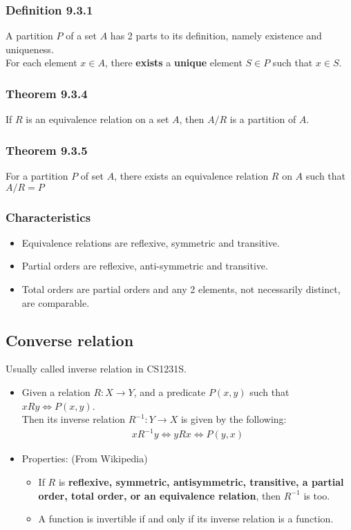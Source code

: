 \documentclass{article}
\begin{document}
\subsubsection{Definition 9.3.1}
A partition $P$ of a set $A$ has 2 parts to its definition, namely existence and uniqueness.\\ 
For each element $x\in A$, there \textbf{exists} a \textbf{unique} element $S\in P$ such that $x\in S$.

\subsubsection{Theorem 9.3.4}
If $R$ is an equivalence relation on a set $A$, then $A/R$ is a partition of $A$.

\subsubsection{Theorem 9.3.5}
For a partition $P$ of set $A$, there exists an equivalence relation $R$ on $A$ such that $A/R=P$

\subsubsection{Characteristics}
\begin{itemize}
	\item Equivalence relations are reflexive, symmetric and transitive.
	\item Partial orders are reflexive, anti-symmetric and transitive.
	\item Total orders are partial orders and any 2 elements, not necessarily distinct, are comparable.
\end{itemize}

\subsection{Converse relation}
Usually called inverse relation in CS1231S.
\begin{itemize}
	\item Given a relation $R:X\rightarrow Y$, and a predicate $P(x,y)$ such that $xRy\iff P(x,y)$.\\
	Then its inverse relation $R^{-1}:Y\rightarrow X$ is given by the following: 
	\begin{align*}
		xR^{-1}y \iff yRx \iff P(y, x)
	\end{align*}
	\item Properties: (From Wikipedia)
	\begin{itemize}
		\item If $R$ is  \textbf{reflexive, symmetric, antisymmetric, transitive, a partial order, total order, or an equivalence relation}, then $R^{-1}$ is too.
		\item A function is invertible if and only if its inverse relation is a function.
	\end{itemize}
\end{itemize}
\end{document}
